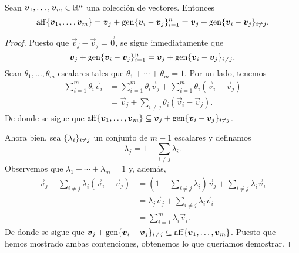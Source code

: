 \begin{lemma}
	\label{lemma:aff}
	Sean $\boldsymbol{v}_1, \ldots, \boldsymbol{v}_m \in \mathbb{R}^n$ una colección de vectores. Entonces
	\begin{equation*}
		\operatorname{aff}\lbrace \boldsymbol{v}_1, \ldots, \boldsymbol{v}_m \rbrace = \boldsymbol{v}_j + \operatorname{gen}\lbrace \boldsymbol{v}_i -
		\boldsymbol{v}_j \rbrace_{i=1}^{n} = \boldsymbol{v}_j + \operatorname{gen}\lbrace \boldsymbol{v}_i - \boldsymbol{v}_j \rbrace_{i\neq j}.
	\end{equation*}
\end{lemma}
\begin{proof}
	Puesto que $\vec{v}_j - \vec{v}_j = \vec{0}$, se sigue inmediatamente que
	\begin{equation*}
		\boldsymbol{v}_j + \operatorname{gen}\lbrace \boldsymbol{v}_i - \boldsymbol{v}_j \rbrace_{i = 1}^{n}
		=
		\boldsymbol{v}_j + \operatorname{gen}\lbrace \boldsymbol{v}_i - \boldsymbol{v}_j \rbrace_{i \neq j}.
	\end{equation*}
	Sean $\theta_1, \ldots, \theta_m$ escalares tales que $\theta_1 + \cdots + \theta_m = 1$. Por un
	lado, tenemos
	\begin{align*}
		\sum_{i=1}^{m}\theta_i\vec{v}_i
		&= \sum_{i=1}^{m}\theta_i\vec{v}_j + \sum_{i=1}^{m}\theta_i(\vec{v}_i - \vec{v}_j)  \\
		&= \vec{v}_j  + \sum_{i \neq j}\theta_i(\vec{v}_i - \vec{v}_j).
	\end{align*}
	De donde se sigue que $\operatorname{aff}\lbrace \boldsymbol{v}_1, \ldots, \boldsymbol{v}_m \rbrace \subseteq \boldsymbol{v}_j +
	\operatorname{gen}\lbrace \boldsymbol{v}_i - \boldsymbol{v}_j \rbrace_{i \neq j}$.

	Ahora bien, sea $\lbrace \lambda_i \rbrace_{i \neq j}$ un conjunto de $m - 1$ escalares y definamos
	\begin{equation*}
		\lambda_j = 1 - \sum_{i \neq j}\lambda_i.
	\end{equation*}
	Observemos que $\lambda_1 + \cdots + \lambda_m = 1$ y, además,
	\begin{align*}
		\vec{v}_j + \sum_{i \neq j}\lambda_i(\vec{v}_i - \vec{v}_j)
		&= \left(1 - \sum_{i \neq j}\lambda_i\right)\vec{v}_j
		+ \sum_{i \neq j}\lambda_i\vec{v}_i \\
		&= \lambda_j\vec{v}_j + \sum_{i \neq j}\lambda_i\vec{v}_i \\
		&= \sum_{i = 1}^{m}\lambda_i\vec{v}_i.
	\end{align*}
	De donde se sigue que $\boldsymbol{v}_j + \operatorname{gen}\lbrace \boldsymbol{v}_i - \boldsymbol{v}_j \rbrace_{i \neq j} \subseteq
	\operatorname{aff}\lbrace \boldsymbol{v}_1, \ldots, \boldsymbol{v}_m \rbrace$. Puesto que hemos mostrado ambas contenciones,
	obtenemos lo que queríamos demostrar.
\end{proof}
